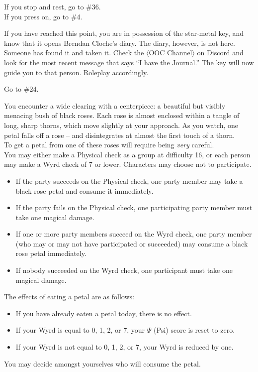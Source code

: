 \documentclass[white]{gl2018}
\begin{document}
\begin{large}
\begin{location}{20}
\begin{fromhere} If you stop and rest, go to \#36.\\
 If you press on, go to \#4.
\end{fromhere}
\end{location}
\begin{location}{21}
If you have reached this point, you are in possession of the star-metal key, and know that it opens Brendan Cloche's diary. The diary, however, is not here. Someone has found it and taken it. Check the $\langle$OOC Channel$\rangle$ on Discord and look for the most recent message that says ``I have the Journal.'' The key will now guide you to that person.  Roleplay accordingly. 
\begin{fromhere}Go to \#24.\end{fromhere}
\end{location}
\begin{location}{22}
You encounter a wide clearing with a centerpiece: a beautiful but visibly menacing bush of black roses.  Each rose is almost enclosed within a tangle of long, sharp thorns, which move slightly at your approach.  As you watch, one petal falls off a rose -- and disintegrates at almost the first touch of a thorn.\\

To get a petal from one of these roses will require being {\em very} careful.\\

You may either make a Physical check as a group at difficulty 16, or each person may make a Wyrd check of 7 or lower.  Characters may choose not to participate.
\begin{itemize} 
\item If the party succeeds on the Physical check, one party member may take a black rose petal and consume it immediately. 
\item If the party fails on the Physical check, one participating party member must take one magical damage.
\item If one or more party members succeed on the Wyrd check, one party member (who may or may not have participated or succeeded) may consume a black rose petal immediately.
\item If nobody succeeded on the Wyrd check, one participant must take one magical damage.
\end{itemize}
The effects of eating a petal are as follows:
\begin{itemize}
\item If you have already eaten a petal today, there is no effect.
\item If your Wyrd is equal to 0, 1, 2, or 7, your $\Psi$ (Psi) score is reset to zero.
\item If your Wyrd is not equal to 0, 1, 2, or 7, your Wyrd is reduced by one.
\end{itemize}
You may decide amongst yourselves who will consume the petal.


\end{location}
\end{large}
\end{document}
